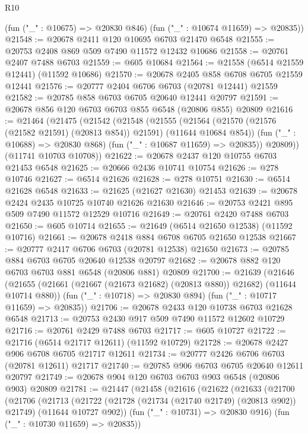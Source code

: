 \begin{lexlean}{R10}
\begin{coremodule}
      (fun ("_" : @10675) => @20830 @846)
      (fun ("_" : @10674 @11659) => @20835))
@21548 := @20678 @2411 @120 @10695 @6703 @21470 @6548
@21555 := @20753 @2408 @869 @509 @7490 @11572 @12432 @10686
@21558 := @20761 @2407 @7488 @6703
@21559 := @605 @10684
@21564 := @21558 (@6514 @21559 @12441) (@11592 @10686)
@21570 := @20678 @2405 @858 @6708 @6705 @21559 @12441
@21576 := @20777 @2404 @6706 @6703 (@20781 @12441) @21559
@21582 := @20785 @858 @6703 @6705 @20640 @12441 @20797
@21591 := @20678 @856 @120 @6703 @6703 @855 @6548 (@20806 @855) @20809
@21616 := @21464
    (@21475
      (@21542
        (@21548
          (@21555
            (@21564 (@21570 (@21576 (@21582 @21591) (@20813 @854)) @21591) (@11644 @10684 @854))
            (fun ("_" : @10688) => @20830 @868)
            (fun ("_" : @10687 @11659) => @20835))
          @20809))
      (@11741 @10703 @10708))
@21622 := @20678 @2437 @120 @10755 @6703 @21453 @6548
@21625 := @20666 @2436 @10741 @10754
@21626 := @278 @10746
@21627 := @6514 @21626
@21628 := @278 @10751
@21630 := @6514 @21628 @6548
@21633 := @21625 (@21627 @21630) @21453
@21639 := @20678 @2424 @2435 @10725 @10740 @21626 @21630
@21646 := @20753 @2421 @895 @509 @7490 @11572 @12529 @10716
@21649 := @20761 @2420 @7488 @6703
@21650 := @605 @10714
@21655 := @21649 (@6514 @21650 @12538) (@11592 @10716)
@21661 := @20678 @2418 @884 @6708 @6705 @21650 @12538
@21667 := @20777 @2417 @6706 @6703 (@20781 @12538) @21650
@21673 := @20785 @884 @6703 @6705 @20640 @12538 @20797
@21682 := @20678 @882 @120 @6703 @6703 @881 @6548 (@20806 @881) @20809
@21700 := @21639
    (@21646
      (@21655 (@21661 (@21667 (@21673 @21682) (@20813 @880)) @21682) (@11644 @10714 @880))
      (fun ("_" : @10718) => @20830 @894)
      (fun ("_" : @10717 @11659) => @20835))
@21706 := @20678 @2433 @120 @10738 @6703 @21628 @6548
@21713 := @20753 @2430 @917 @509 @7490 @11572 @12602 @10729
@21716 := @20761 @2429 @7488 @6703
@21717 := @605 @10727
@21722 := @21716 (@6514 @21717 @12611) (@11592 @10729)
@21728 := @20678 @2427 @906 @6708 @6705 @21717 @12611
@21734 := @20777 @2426 @6706 @6703 (@20781 @12611) @21717
@21740 := @20785 @906 @6703 @6705 @20640 @12611 @20797
@21749 := @20678 @904 @120 @6703 @6703 @903 @6548 (@20806 @903) @20809
@21781 := @21447
    (@21458
      (@21616
        (@21622
          (@21633
            (@21700
              (@21706
                (@21713
                  (@21722
                    (@21728 (@21734 (@21740 @21749) (@20813 @902)) @21749)
                    (@11644 @10727 @902))
                  (fun ("_" : @10731) => @20830 @916)
                  (fun ("_" : @10730 @11659) => @20835))

\end{coremodule}
\end{lexlean}
